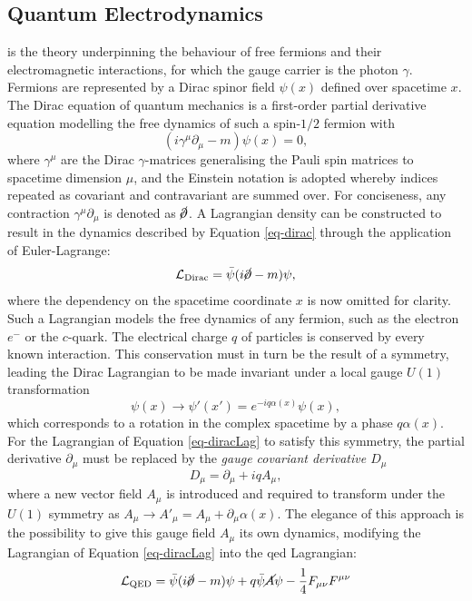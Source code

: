 \subsection{Quantum Electrodynamics}\label{subsec-QED}
 is the theory underpinning the behaviour of free fermions and their electromagnetic interactions, for which the gauge carrier is the photon $\gamma$. Fermions are represented by a Dirac spinor field $\psi(x)$ defined over spacetime $x$. The Dirac equation of quantum mechanics is a first-order partial derivative equation modelling the free dynamics of such a spin-$1/2$ fermion with
\begin{equation}\label{eq-dirac}
    (i\gamma^{\mu} \partial_{\mu} - m) \psi(x) = 0,
\end{equation}
where $\gamma^{\mu}$ are the Dirac $\gamma$-matrices generalising the Pauli spin matrices to spacetime dimension $\mu$, and the Einstein notation is adopted whereby indices repeated as covariant and contravariant are summed over. For conciseness, any contraction $\gamma^{\mu} \partial_{\mu}$ is denoted as $\cancel{\partial}$. A Lagrangian density can be constructed to result in the dynamics described by Equation \ref{eq-dirac} through the application of Euler-Lagrange:
\begin{equation}\label{eq-diracLag}
   \mathcal{L}_{\text{Dirac}} = \bar{\psi} (i \cancel{\partial}- m) \psi,
\end{equation}
where the dependency on the spacetime coordinate $x$ is now omitted for clarity. Such a Lagrangian models the free dynamics of any fermion, such as the electron $e^-$ or the $c$-quark. The electrical charge $q$ of particles is conserved by every known interaction. This conservation must in turn be the result of a symmetry, leading the Dirac Lagrangian to be made invariant under a local gauge $U(1)$ transformation
\begin{equation}\label{eq-GaugeU1}
    \psi(x) \rightarrow \psi'(x') = e^{-iq\alpha(x)} \psi(x),
\end{equation}
which corresponds to a rotation in the complex spacetime by a phase $q\alpha(x)$. For the Lagrangian of Equation \ref{eq-diracLag} to satisfy this symmetry, the partial derivative $\partial_{\mu}$ must be replaced by the \textit{gauge covariant derivative $D_{\mu}$}
\begin{equation}\label{eq-CoDerU1}
    D_{\mu} = \partial_{\mu} + iqA_{\mu},
\end{equation}
where a new vector field $A_{\mu}$ is introduced and required to transform under the $U(1)$ symmetry as $A_{\mu} \rightarrow A'_{\mu} = A_{\mu} + \partial_{\mu} \alpha(x)$. The elegance of this approach is the possibility to give this gauge field $A_{\mu}$ its own dynamics, modifying the Lagrangian of Equation \ref{eq-diracLag} into the \gls{qed} Lagrangian: \[ \mathcal{L}_{\text{QED}} = \bar{\psi} (i \cancel{\partial}- m) \psi + q \bar{\psi} \cancel{A} \psi - \frac{1}{4} F_{\mu\nu} F^{\mu\nu} \]
